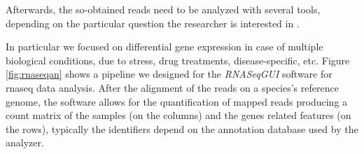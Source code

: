 Afterwards, the so-obtained reads need to be analyzed with several tools, depending on the particular question the researcher is interested in \cite{Pepke2009, Oshlack2010}.



In particular we focused on differential gene expression in case of multiple biological conditions, due to stress, drug treatments, disease-specific, etc. 
Figure \ref{fig:rnaseqan} shows a pipeline we designed for the \textit{RNASeqGUI} \cite{russo2015advantages} software for \gls{rnaseq} data analysis.
After the alignment of the reads on a species's reference genome, the software allows for the quantification of mapped reads producing a count matrix of the samples (on the columns) and the genes related features (on the rows), typically the identifiers depend on the annotation database used by the analyzer.


